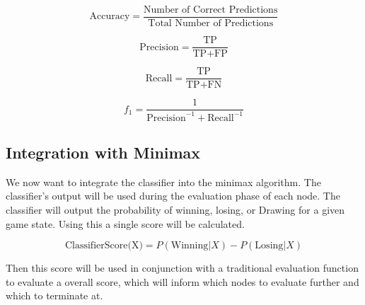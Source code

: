 \documentclass{article}
\begin{document}
\begin{equation}
    \label{eq:accuracy}
    \text{Accuracy} = \frac{\text{Number of Correct Predictions}}{\text{Total Number of Predictions}}
\end{equation}

\begin{equation}
    \label{eq:precision}
    \text{Precision} = \frac{\text{TP}}{\text{TP} + \text{FP}}
\end{equation}

\begin{equation}
    \label{eq:recall}
    \text{Recall} = \frac{\text{TP}}{\text{TP} + \text{FN}}
\end{equation}

\begin{equation}
    \label{eq:f1}
    f_1 =  \frac{1}{\text{Precision}^{-1} + \text{Recall}^{-1}}
\end{equation}


\subsection{Integration with Minimax}
\label{sec:integration}
We now want to integrate the classifier into the minimax algorithm. The classifier's output will be used 
during the evaluation phase of each node. The classifier will output the probability of winning, losing, or Drawing
for a given game state. Using this a single score will be calculated.

\begin{equation}
    \label{eq:score}
    \text{ClassifierScore(X)} = P(\text{Winning}|X) - P(\text{Losing}|X)
\end{equation}

Then this score will be used in conjunction with a traditional evaluation function to evaluate 
a overall score, which will inform which nodes to evaluate further and which to terminate at.





\end{document}
